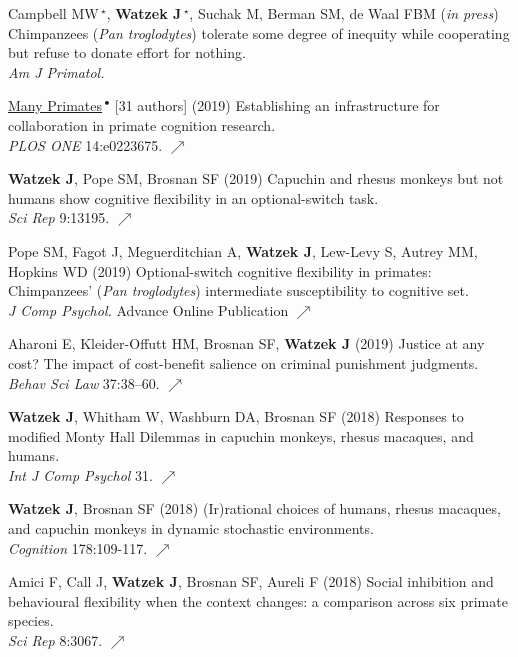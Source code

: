 \documentclass[]{friggeri-cv}
\begin{document}
\begin{enumerate}[label={[\,\arabic*\,]}]
  \item {Campbell MW\,{\Large${}^\star$}, \textbf{Watzek J\,{\Large${}^\star$}}, Suchak M, Berman SM, de Waal FBM (\emph{in press}) Chimpanzees (\emph{Pan troglodytes}) tolerate some degree of inequity while cooperating but refuse to donate effort for nothing. \\\emph{Am J Primatol.}}
  \item {\ul{Many Primates}\,${}^\bullet$ [31 authors] (2019) Establishing an infrastructure for collaboration in primate cognition research. \\\emph{PLOS ONE} 14:e0223675. \href{https://doi.org/10.1371/journal.pone.0223675}{\small $\nearrow$}}
  \item {\textbf{Watzek J}, Pope SM, Brosnan SF (2019) Capuchin and rhesus monkeys but not humans show cognitive flexibility in an optional-switch task. \\\emph{Sci Rep} 9:13195. \href{https://doi.org/10.1038/s41598-019-49658-0}{\small $\nearrow$}}
  \item {Pope SM, Fagot J, Meguerditchian A, \textbf{Watzek J}, Lew-Levy S, Autrey MM, Hopkins WD (2019) Optional-switch cognitive flexibility in primates: Chimpanzees' (\emph{Pan troglodytes}) intermediate susceptibility to cognitive set. \\\emph{J Comp Psychol.} Advance Online Publication \href{https://doi.org/10.1037/com0000194}{\small $\nearrow$} }
  \item {Aharoni E, Kleider-Offutt HM, Brosnan SF, \textbf{Watzek J} (2019) Justice at any cost? The impact of cost-benefit salience on criminal punishment judgments. \\\emph{Behav Sci Law} 37:38–60. \href{https://doi.org/10.1002/bsl.2388}{{\small $\nearrow$}}}
  \item {\textbf{Watzek J}, Whitham W, Washburn DA, Brosnan SF (2018) Responses to modified Monty Hall Dilemmas in capuchin monkeys, rhesus macaques, and humans. \\\emph{Int J Comp Psychol} 31. \href{https://escholarship.org/uc/item/1jn0t21r}{\small $\nearrow$}}
  \item {\textbf{Watzek J}, Brosnan SF (2018) (Ir)rational choices of humans, rhesus macaques, and capuchin monkeys in dynamic stochastic environments. \\\emph{Cognition} 178:109-117. \href{https://doi.org/10.1016/j.cognition.2018.05.019}{\small $\nearrow$}} \enlargethispage{1.75\baselineskip}
  \item {Amici F, Call J, \textbf{Watzek J}, Brosnan SF, Aureli F (2018) Social inhibition and behavioural flexibility when the context changes: a comparison across six primate species. \\\emph{Sci Rep} 8:3067. \href{https://doi.org/10.1038/s41598-018-21496-6}{\small $\nearrow$}}

\end{enumerate}
\end{document}
